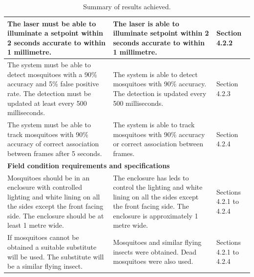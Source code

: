 \begin{table}[!htb]
\begin{tabularx}{\textwidth}{|X|X|l|}
    \hline
    The laser must be able to illuminate a setpoint within 2 seconds accurate to within 1 millimetre.                                                                            &
    The laser is able to illuminate setpoint within 2 seconds accurate to within 1 millimetre.                                                                                   &
    Section 4.2.2                                                                                                                                                                                                                                                                                                                                                               \\
    \hline
    The system must be able to detect mosquitoes with a 90\% accuracy and 5\% false positive rate. The detection must be updated at least every 500 milliseconds.                & The system is able to detect mosquitoes with 90\% accuracy. The detection is updated every 500 milliseconds.                                                       & Section 4.2.3           \\
    \hline
    The system must be able to track mosquitoes with 90\% accuracy of correct association between frames after 5 seconds.                                                        & The system is able to track mosquitoes with 90\% accuracy or correct association between frames.                                                                   & Section 4.2.4           \\
    \hline
    \multicolumn{3}{|l|}{\textbf{Field condition requirements and specifications}}                                                                                                                                                                                                                                                                                              \\
    \hline
    Mosquitoes should be in an enclosure with controlled lighting and white lining on all the sides except the front facing side. The enclosure should be at least 1 metre wide. & The enclosure has \glspl{led} to control the lighting and white lining on all the sides except the front facing side. The enclosure is approximately 1 metre wide. & Sections 4.2.1 to 4.2.4 \\
    \hline
    If mosquitoes cannot be obtained a suitable substitute will be used. The substitute will be a similar flying insect.                                                         & Mosquitoes and similar flying insects were obtained. Dead mosquitoes were also used.                                                                               & Sections 4.2.1 to 4.2.4 \\
    \hline
  \end{tabularx}
  \caption{Summary of results achieved.}
  \label{tab:results_summary}
\end{table}

